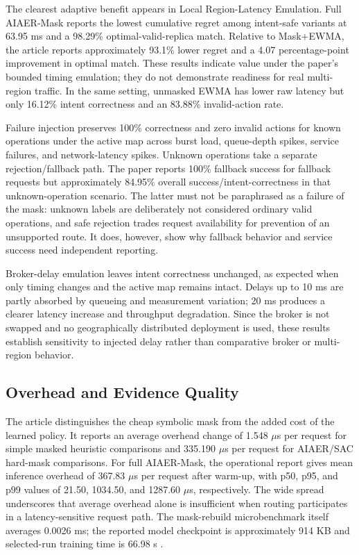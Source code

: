 \documentclass[conference]{IEEEtran}
\begin{document}
The clearest adaptive benefit appears in Local Region-Latency Emulation. Full AIAER-Mask reports the lowest cumulative regret among intent-safe variants at 63.95 ms and a 98.29\% optimal-valid-replica match. Relative to Mask+EWMA, the article reports approximately 93.1\% lower regret and a 4.07 percentage-point improvement in optimal match. These results indicate value under the paper's bounded timing emulation; they do not demonstrate readiness for real multi-region traffic. In the same setting, unmasked EWMA has lower raw latency but only 16.12\% intent correctness and an 83.88\% invalid-action rate.

Failure injection preserves 100\% correctness and zero invalid actions for known operations under the active map across burst load, queue-depth spikes, service failures, and network-latency spikes. Unknown operations take a separate rejection/fallback path. The paper reports 100\% fallback success for fallback requests but approximately 84.95\% overall success/intent-correctness in that unknown-operation scenario. The latter must not be paraphrased as a failure of the mask: unknown labels are deliberately not considered ordinary valid operations, and safe rejection trades request availability for prevention of an unsupported route. It does, however, show why fallback behavior and service success need independent reporting.

Broker-delay emulation leaves intent correctness unchanged, as expected when only timing changes and the active map remains intact. Delays up to 10 ms are partly absorbed by queueing and measurement variation; 20 ms produces a clearer latency increase and throughput degradation. Since the broker is not swapped and no geographically distributed deployment is used, these results establish sensitivity to injected delay rather than comparative broker or multi-region behavior.

\subsection{Overhead and Evidence Quality}
The article distinguishes the cheap symbolic mask from the added cost of the learned policy. It reports an average overhead change of 1.548 $\mu$s per request for simple masked heuristic comparisons and 335.190 $\mu$s per request for AIAER/SAC hard-mask comparisons. For full AIAER-Mask, the operational report gives mean inference overhead of 367.83 $\mu$s per request after warm-up, with p50, p95, and p99 values of 21.50, 1034.50, and 1287.60 $\mu$s, respectively. The wide spread underscores that average overhead alone is insufficient when routing participates in a latency-sensitive request path. The mask-rebuild microbenchmark itself averages 0.0026 ms; the reported model checkpoint is approximately 914 KB and selected-run training time is 66.98 s \cite{hassan2026}.
\end{document}
